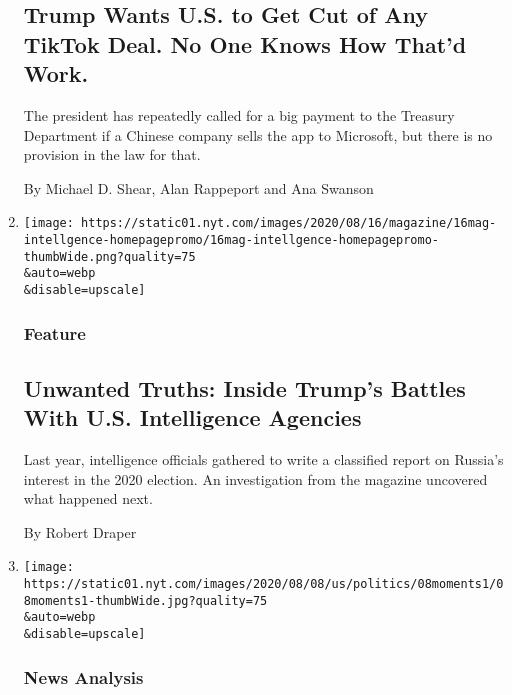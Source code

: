 \begin{enumerate}
{  \subsection{Trump Wants U.S. to Get Cut of Any TikTok Deal. No One
  Knows How That'd
  Work.}\label{trump-wants-us-to-get-cut-of-any-tiktok-deal-no-one-knows-how-thatd-work}}

  The president has repeatedly called for a big payment to the Treasury
  Department if a Chinese company sells the app to Microsoft, but there
  is no provision in the law for that.

  By Michael D. Shear, Alan Rappeport and Ana Swanson
\item
  \href{/2020/08/08/magazine/us-russia-intelligence.html}{}

  \texttt{[image: https://static01.nyt.com/images/2020/08/16/magazine/16mag-intellgence-homepagepromo/16mag-intellgence-homepagepromo-thumbWide.png?quality=75\\\&auto=webp\\\&disable=upscale]}

  \hypertarget{feature}{%
  \subsubsection{Feature}\label{feature}}

  \hypertarget{unwanted-truths-inside-trumps-battles-with-us-intelligence-agencies}{%
  \subsection{Unwanted Truths: Inside Trump's Battles With U.S.
  Intelligence
  Agencies}\label{unwanted-truths-inside-trumps-battles-with-us-intelligence-agencies}}

  Last year, intelligence officials gathered to write a classified
  report on Russia's interest in the 2020 election. An investigation
  from the magazine uncovered what happened next.

  By Robert Draper
\item
  \href{/2020/08/08/us/politics/trump-biden-polls-interview.html}{}

  \texttt{[image: https://static01.nyt.com/images/2020/08/08/us/politics/08moments1/08moments1-thumbWide.jpg?quality=75\\\&auto=webp\\\&disable=upscale]}

  \hypertarget{news-analysis}{%
  \subsubsection{News Analysis}\label{news-analysis}}


\end{enumerate}
